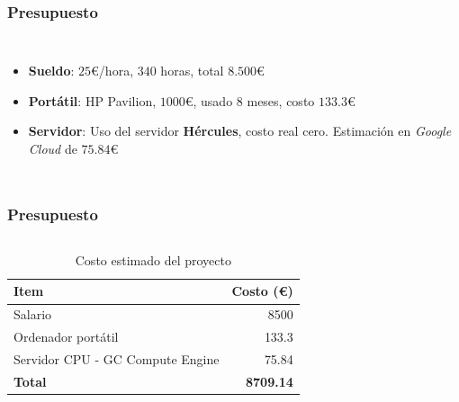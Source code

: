 \begin{frame}
    \frametitle{Presupuesto}
    \begin{columns}
        \begin{itemize}
            \item \textbf{Sueldo}: $25$€/hora, $340$ horas, total $8.500$€
            \item \textbf{Portátil}: HP Pavilion, $1000$€, usado $8$ meses, costo $133.3$€
            \item \textbf{Servidor}: Uso del servidor \textbf{Hércules}, costo real cero. Estimación en \textit{Google Cloud} de $75.84$€
        \end{itemize}
    \end{columns}
\end{frame}

\note{ 

}
 
\begin{frame}
    \frametitle{Presupuesto}
    \begin{columns}
        \begin{table}[htp]
            \centering
            \begin{tabular}{|l|r|}
                \hline
                \textbf{Item}                    & \textbf{Costo (€)} \\ \hline
                Salario                          & 8500               \\
                Ordenador portátil               & 133.3              \\
                Servidor CPU - GC Compute Engine & 75.84              \\
                \textbf{Total}                   & \textbf{8709.14}   \\ \hline
            \end{tabular}
            \caption{Costo estimado del proyecto}
        \end{table}
    \end{columns}
\end{frame}